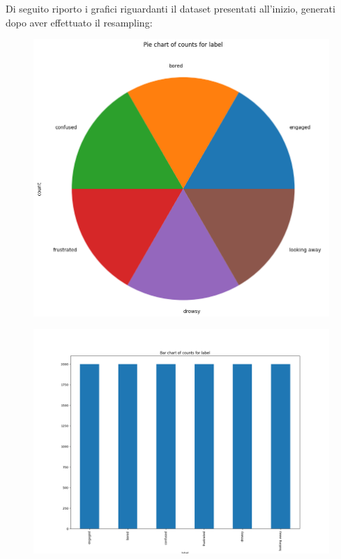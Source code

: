 Di seguito riporto i grafici riguardanti il dataset presentati all’inizio, generati dopo aver effettuato il resampling:
\begin{figure}
    \begin{center}    
        \includegraphics[width=0.9\linewidth]{images/image45.png}
    \end{center}
\end{figure}

\begin{figure}
    \begin{center}    
        \includegraphics[width=0.9\linewidth]{images/image46.png}
    \end{center}
\end{figure}